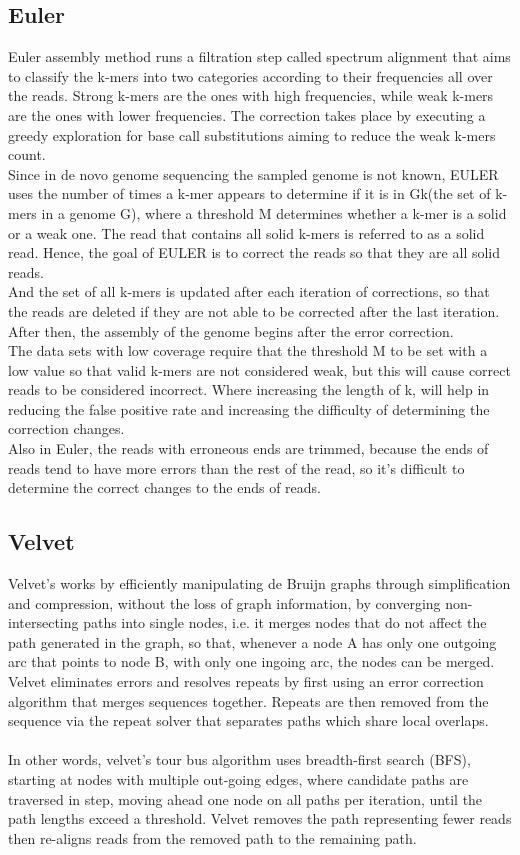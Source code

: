 \documentclass[12pt]{llncs}
\begin{document}
\subsection{Euler}
Euler \cite{Euler} assembly method runs a filtration step called spectrum alignment that aims to classify the k-mers into two categories according to their frequencies all over the reads. Strong k-mers are the ones with high frequencies, while weak k-mers are the ones with lower frequencies. The correction takes place by executing a greedy exploration for base call substitutions aiming to reduce the weak k-mers count.
\\
Since in de novo genome sequencing the sampled genome is not known, EULER uses the number of times a k-mer appears to determine if it is in Gk(the set of k-mers in a genome G), where a threshold M determines whether a k-mer is a solid or a weak one. The read that contains all solid k-mers is referred to as a solid read. Hence, the goal of EULER is to correct the reads so that they are all solid reads.
\\
And the set of all k-mers is updated after each iteration of corrections, so that the reads are deleted if they are not able to be corrected after the last iteration. After then, the assembly of the genome begins after the error correction.
\\
The data sets with low coverage require that the threshold M to be set with a low value so that valid k-mers are not considered weak, but this will cause correct reads to be considered incorrect. 
Where increasing the length of k, will help in reducing the false positive rate and increasing the difficulty of determining the correction changes.
\\
Also in Euler, the reads with erroneous ends are trimmed, because the ends of reads tend to have more errors than the rest of the read, so it's difficult to determine the correct changes to the ends of reads.

\subsection{Velvet}
Velvet's \cite{Velvet} works by efficiently manipulating de Bruijn graphs through simplification and compression, without the loss of graph information, by converging non-intersecting paths into single nodes, i.e. it merges nodes that do not affect the path generated in the graph, so that, whenever a node A has only one outgoing arc that points to node B, with only one ingoing arc, the nodes can be merged.
\\
Velvet eliminates errors and resolves repeats by first using an error correction algorithm that merges sequences together. Repeats are then removed from the sequence via the repeat solver that separates paths which share local overlaps.
\\
\\
In other words, velvet's tour bus algorithm uses breadth-first search (BFS), starting at nodes with multiple out-going edges, where candidate paths are traversed in step, moving ahead one node on all paths per iteration, until the path lengths exceed a threshold. Velvet removes the path representing fewer reads then re-aligns reads from the removed path to the remaining path.
\end{document}

